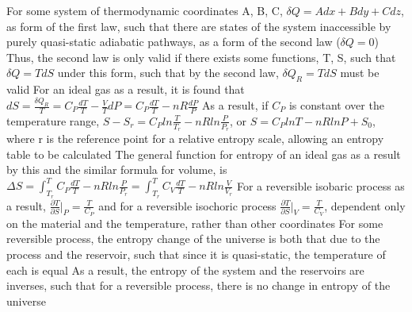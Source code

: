 \begin{outline*}
\2 For some system of thermodynamic coordinates A, B, C, $\delta Q = Adx + Bdy + Cdz$, as form of the first law, such that there are states of the system inaccessible by purely quasi-static adiabatic pathways, as a form of the second law ($\delta Q = 0$)
\3 Thus, the second law is only valid if there exists some functions, T, S, such that $\delta Q = TdS$ under this form, such that by the second law, $\delta Q_R = TdS$ must be valid
\1 For an ideal gas as a result, it is found that $dS = \frac{\delta Q_R}{T} = C_P\frac{dT}{T} - \frac{V}{T}dP = C_P \frac{dT}{T} - nR\frac{dP}{P}$
\2 As a result, if $C_P$ is constant over the temperature range, $S - S_r = C_P ln\frac{T}{T_r} - nR ln\frac{P}{P_r}$, or $S = C_PlnT - nRlnP + S_0$, where r is the reference point for a relative entropy scale, allowing an entropy table to be calculated
\2 The general function for entropy of an ideal gas as a result by this and the similar formula for volume, is $\Delta S = \int^T_{T_r}C_P \frac{dT}{T} - nR ln\frac{P}{P_r} = \int^T_{T_r}C_V \frac{dT}{T} - nR ln\frac{V}{V_r}$ 
\3 For a reversible isobaric process as a result, $\frac{\partial T}{\partial S}|_P = \frac{T}{C_P}$ and for a reversible isochoric process $\frac{\partial T}{\partial S}|_V = \frac{T}{C_V}$, dependent only on the material and the temperature, rather than other coordinates
\1 For some reversible process, the entropy change of the universe is both that due to the process and the reservoir, such that since it is quasi-static, the temperature of each is equal
\2 As a result, the entropy of the system and the reservoirs are inverses, such that for a reversible process, there is no change in entropy of the universe
\end{outline*}
